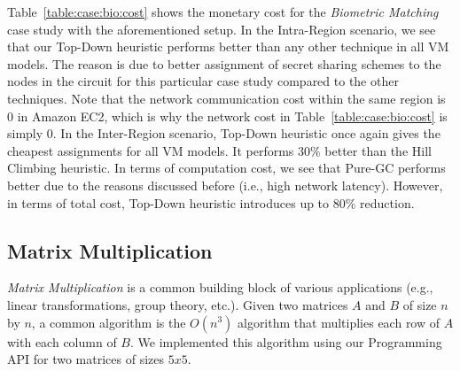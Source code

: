 \documentclass{llncs}
\begin{document}
Table~\ref{table:case:bio:cost} shows the monetary cost for the \emph{Biometric Matching} case study with the aforementioned setup. In the Intra-Region scenario, we see that our Top-Down heuristic performs better than any other technique in all VM models. The reason is due to better assignment of secret sharing schemes to the nodes in the circuit for this particular case study compared to the other techniques. Note that the network communication cost within the same region is $0$ in Amazon EC2, which is why the network cost in Table~\ref{table:case:bio:cost} is simply $0$. In the Inter-Region scenario, Top-Down heuristic once again gives the cheapest assignments for all VM models. It performs $30\%$ better than the Hill Climbing heuristic. In terms of computation cost, we see that Pure-GC performs better due to the reasons discussed before (i.e., high network latency). However, in terms of total cost, Top-Down heuristic introduces up to $80\%$ reduction.

\vspace{-0.45cm}
\subsection{Matrix Multiplication}
\label{sec:case:matrix}

\emph{Matrix Multiplication} is a common building block of various applications (e.g., linear transformations, group theory, etc.). Given two matrices $A$ and $B$ of size $n$ by $n$, a common algorithm is the $O(n^3)$ algorithm that multiplies each row of $A$ with each column of $B$. We implemented this algorithm using our Programming API for two matrices of sizes $5x5$. 
\end{document}
